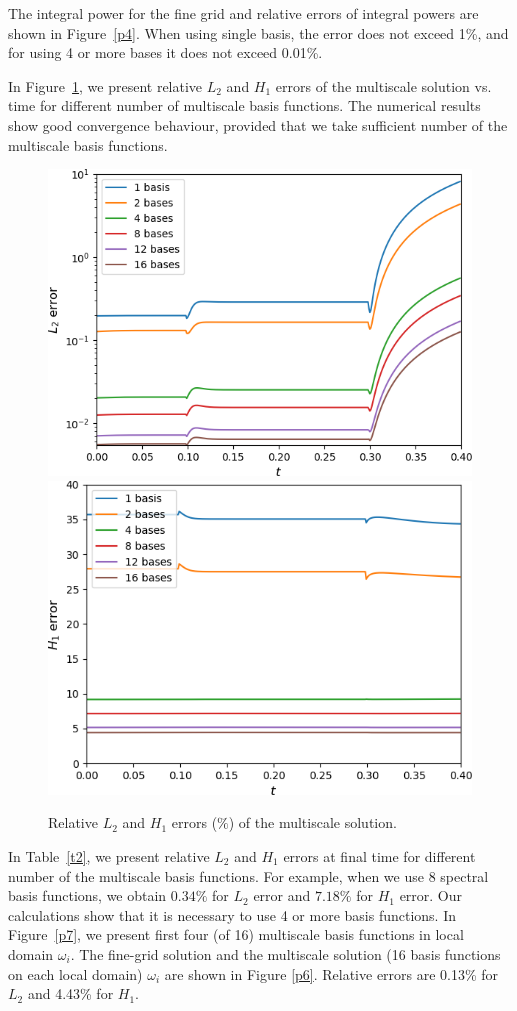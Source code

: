 \documentclass[10pt]{article}
\begin{document}
The integral power for the fine grid and relative errors of integral powers are shown in Figure~\ref{p4}.
When using single basis, the error does not exceed 1\%, and for using 4 or more bases it does not exceed 0.01\%.

In Figure~\ref{p5}, we present relative $L_2$ and $H_1$ errors of the multiscale solution vs. time for different number of multiscale basis functions.
The numerical results show good convergence behaviour, provided that we take sufficient number of the multiscale basis functions.

\begin{figure}[h!]
	\centering
		\includegraphics[width=0.45\linewidth]{L2_log.png} \hspace{2em}
		\includegraphics[width=0.45\linewidth]{H1.png}
	\caption{Relative $L_2$ and $H_1$ errors ($\%$) of the multiscale solution.}
	\label{p5}
\end{figure}

In Table~\ref{t2}, we present relative $L_2$ and $H_1$ errors at final time for different number of the multiscale basis functions.
For example, when we use 8 spectral basis functions, we obtain $0.34\%$ for $L_2$ error and $7.18\%$ for $H_1$ error.
Our calculations show that it is necessary to use 4 or more basis functions.
In Figure~\ref{p7}, we present first four (of 16) multiscale basis functions in local domain $\omega_i$.
The fine-grid solution and the multiscale solution (16 basis functions on each local domain) $\omega_i$ are shown in Figure \ref{p6}. Relative errors are 0.13\% for $L_2$ and 4.43\% for $H_1$.
\end{document}
